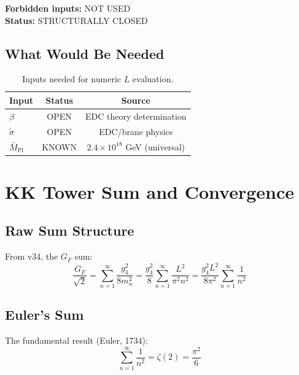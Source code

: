 \documentclass[11pt,a4paper]{article}
\begin{document}
\textbf{Forbidden inputs:} NOT USED \\
\textbf{Status:} STRUCTURALLY CLOSED

\subsection{What Would Be Needed}
\label{subsec:L-needed}

\begin{table}[ht]
\centering
\caption{Inputs needed for numeric $L$ evaluation.}
\label{tab:L-inputs}
\begin{tabular}{lcc}
\toprule
Input & Status & Source \\
\midrule
$\beta$ & OPEN & EDC theory determination \\
$\tilde{\sigma}$ & OPEN & EDC/brane physics \\
$\bar{M}_{\text{Pl}}$ & KNOWN & $2.4 \times 10^{18}$ GeV (universal) \\
\bottomrule
\end{tabular}
\end{table}

\section{KK Tower Sum and Convergence}
\label{sec:kk-convergence}

\subsection{Raw Sum Structure}
\label{subsec:raw-sum}

From v34, the $G_F$ sum:
\begin{equation}
\label{eq:gf-sum-raw}
\frac{G_F}{\sqrt{2}} = \sum_{n=1}^{\infty} \frac{g_4^2}{8 m_n^2}
= \frac{g_4^2}{8} \sum_{n=1}^{\infty} \frac{L^2}{\pi^2 n^2}
= \frac{g_4^2 L^2}{8\pi^2} \sum_{n=1}^{\infty} \frac{1}{n^2}
\end{equation}

\subsection{Euler's Sum}
\label{subsec:euler-sum}

The fundamental result (Euler, 1734):
\begin{equation}
\label{eq:zeta-2}
\boxed{\sum_{n=1}^{\infty} \frac{1}{n^2} = \zeta(2) = \frac{\pi^2}{6}}
\end{equation}
\end{document}
